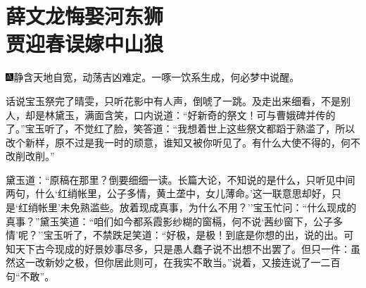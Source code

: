 \chapter{薛文龙悔娶河东狮\\贾迎春误嫁中山狼}

{\includegraphics[width=3mm]{../Images/00005}\kaishu 静含天地自宽，动荡吉凶难定。一啄一饮系生成，何必梦中说醒。}

话说宝玉祭完了晴雯，只听花影中有人声，倒唬了一跳。及走出来细看，不是别人，却是林黛玉，满面含笑，口内说道：``好新奇的祭文！可与曹娥碑并传的了。''宝玉听了，不觉红了脸，笑答道：``我想着世上这些祭文都蹈于熟滥了，所以改个新样，原不过是我一时的顽意，谁知又被你听见了。有什么大使不得的，何不改削改削。''

黛玉道：``原稿在那里？倒要细细一读。长篇大论，不知说的是什么，只听见中间两句，什么`红绡帐里，公子多情，黄土垄中，女儿薄命。'这一联意思却好，只是`红绡帐里'未免熟滥些。放着现成真事，为什么不用？''宝玉忙问：``什么现成的真事？''黛玉笑道：``咱们如今都系霞影纱糊的窗槅，何不说`茜纱窗下，公子多情'呢？''宝玉听了，不禁跌足笑道：``好极，是极！到底是你想的出，说的出。可知天下古今现成的好景妙事尽多，只是愚人蠢子说不出想不出罢了。但只一件：虽然这一改新妙之极，但你居此则可，在我实不敢当。''说着，又接连说了一二百句``不敢''。


